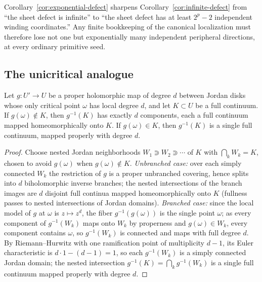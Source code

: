 \begin{remark}\label{rem:sharper-bookkeeping}
Corollary~\ref{cor:exponential-defect} sharpens
Corollary~\ref{cor:infinite-defect} from ``the sheet defect is
infinite'' to ``the sheet defect has at least $2^{p}-2$ independent
winding coordinates.''  Any finite bookkeeping of the canonical
localization must therefore lose not one but exponentially many
independent peripheral directions, at every ordinary primitive seed.
\end{remark}

\subsection{The unicritical analogue}

\begin{lemma}\label{lem:degree-d-pullback}
Let $g\colon U'\to U$ be a proper holomorphic map of degree $d$ between Jordan disks whose only critical point $\omega$ has local degree $d$, and let $K\subset U$ be a full continuum.  If $g(\omega)\notin K$, then $g^{-1}(K)$ has exactly $d$ components, each a full continuum mapped homeomorphically onto $K$.  If $g(\omega)\in K$, then $g^{-1}(K)$ is a single full continuum, mapped properly with degree $d$.
\end{lemma}
\begin{proof}
Choose nested Jordan neighborhoods $W_1\Supset W_2\Supset\cdots$ of $K$ with $\bigcap_k W_k=K$, chosen to avoid $g(\omega)$ when $g(\omega)\notin K$.  \emph{Unbranched case:} over each simply connected $W_k$ the restriction of $g$ is a proper unbranched covering, hence splits into $d$ biholomorphic inverse branches; the nested intersections of the branch images are $d$ disjoint full continua mapped homeomorphically onto $K$ (fullness passes to nested intersections of Jordan domains).  \emph{Branched case:} since the local model of $g$ at $\omega$ is $z\mapsto z^{d}$, the fiber $g^{-1}(g(\omega))$ is the single point $\omega$; as every component of $g^{-1}(W_k)$ maps onto $W_k$ by properness and $g(\omega)\in W_k$, every component contains $\omega$, so $g^{-1}(W_k)$ is connected and maps with full degree $d$.  By Riemann--Hurwitz with one ramification point of multiplicity $d-1$, its Euler characteristic is $d\cdot1-(d-1)=1$, so each $g^{-1}(W_k)$ is a simply connected Jordan domain; the nested intersection $g^{-1}(K)=\bigcap_k g^{-1}(W_k)$ is a single full continuum mapped properly with degree $d$.
\end{proof}

